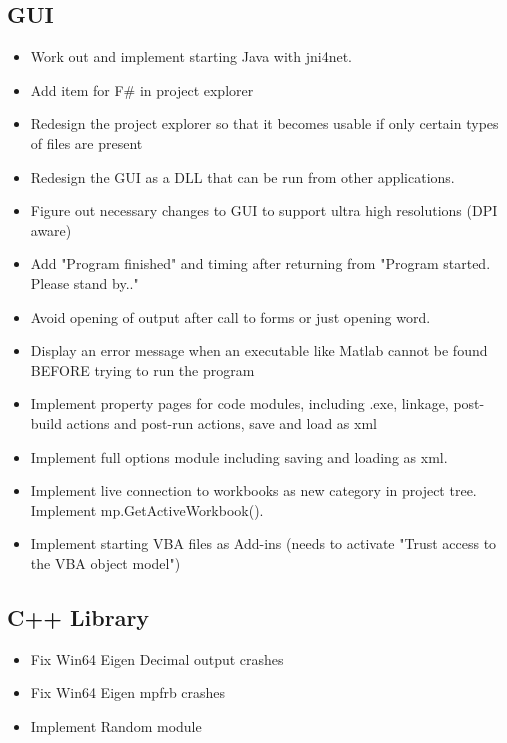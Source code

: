	\subsection{GUI}
	\begin{itemize}
		\item Work out and implement starting Java with jni4net.
		\item Add item for F\# in project explorer
		\item Redesign the project explorer so that it becomes usable if only certain types of files are present
		\item Redesign the GUI as a DLL that can be run from other applications.
		\item Figure out necessary changes to GUI to support ultra high resolutions (DPI aware)
		\item Add "Program finished" and timing after returning from "Program started.  Please stand by.."
		\item Avoid opening of output after call to forms or just opening word.
		\item Display an error message when an executable like Matlab cannot be found BEFORE trying to run the program
		\item Implement property pages for code modules, including .exe, linkage, post-build actions and post-run actions, save and load as xml
		\item Implement full options module including saving and loading as xml.
		\item Implement live connection to workbooks as new category in project tree. Implement mp.GetActiveWorkbook().
		\item Implement starting VBA files as Add-ins (needs to activate "Trust access to the VBA object model")
	\end{itemize}
	
	
	\subsection{C++ Library}
	\begin{itemize}
		\item Fix Win64 Eigen Decimal output crashes
		\item Fix Win64 Eigen mpfrb crashes
		\item Implement Random module
	\end{itemize}
	
	
